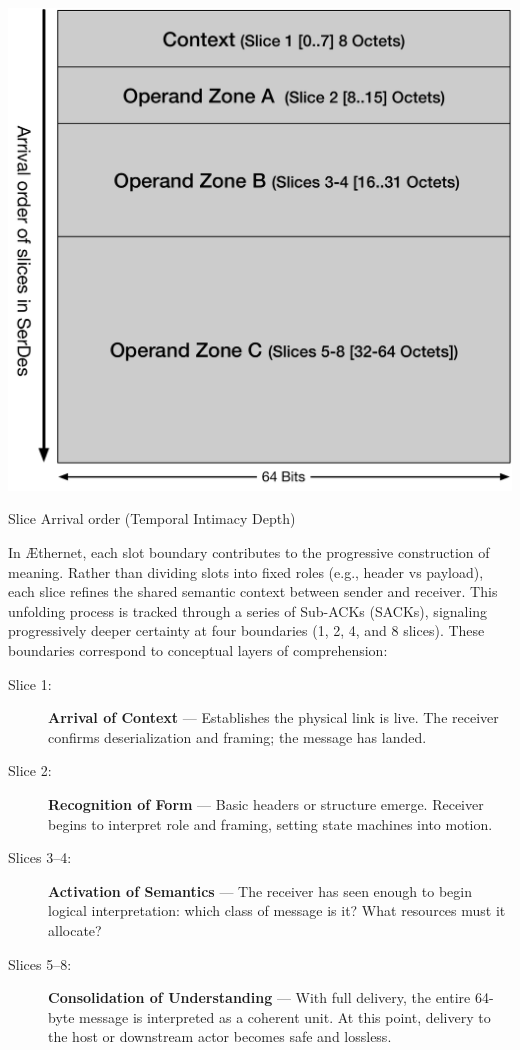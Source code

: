\documentclass[../OAE-SPEC-MAIN.tex]{subfiles}
\begin{document}
\begin{marginfigure}[+40mm]
   \hspace{-18pt}    \includegraphics[width=1.12\linewidth]{./figures/slice-arrival.pdf}
  \caption{Slice Arrival order (Temporal  Intimacy Depth)}
\end{marginfigure}

In \AE thernet, each slot boundary contributes to the progressive construction of meaning. Rather than dividing slots into fixed roles (e.g., header vs payload), each slice refines the shared semantic context between sender and receiver. This unfolding process is tracked through a series of Sub-ACKs (SACKs), signaling progressively deeper certainty at four boundaries (1, 2, 4, and 8 slices). These boundaries correspond to conceptual layers of comprehension:

\begin{description}
  \item [Slice 1:] \textbf{Arrival of Context} — Establishes the physical link is live. The receiver confirms deserialization and framing; the message has landed.

  \item [Slice 2:] \textbf{Recognition of Form} — Basic headers or structure emerge. Receiver begins to interpret role and framing, setting state machines into motion.

  \item [Slices 3–4:] \textbf{Activation of Semantics} — The receiver has seen enough to begin logical interpretation: which class of message is it? What resources must it allocate?

  \item [Slices 5–8:] \textbf{Consolidation of Understanding} — With full delivery, the entire 64-byte message is interpreted as a coherent unit. At this point, delivery to the host or downstream actor becomes safe and lossless.

\end{description}
\end{document}
